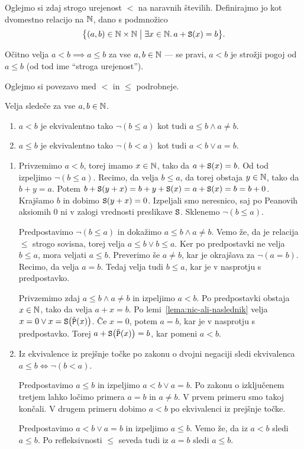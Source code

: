 Oglejmo si zdaj strogo urejenost $<$ na naravnih številih.  Definirajmo jo kot dvomestno relacijo na $\mathbb{N}$, dano s podmnožico
\[\set[1]{(a, b) \in \NN \times \NN}{\some{x \in \NN}{a + \suc(x) = b}}.\]

Očitno velja $a < b \implies a \leq b$ za vse $a, b \in \mathbb{N}$ --- se pravi, $a < b$ je strožji pogoj od $a \leq b$ (od tod ime ``stroga urejenost'').

Oglejmo si povezavo med $<$ in $\leq$ podrobneje.

\begin{trditev}
Velja sledeče za vse $a, b \in \mathbb{N}$.
\begin{enumerate}
\item
$a < b$ je ekvivalentno tako $\lnot(b \leq a)$ kot tudi $a \leq b \land a \neq b$.
\item
$a \leq b$ je ekvivalentno tako $\lnot(b < a)$ kot tudi $a < b \lor a = b$.
\end{enumerate}
\end{trditev}

\begin{dokaz}
\begin{enumerate}
\item
Privzemimo $a < b$, torej imamo $x \in \mathbb{N}$, tako da $a + \mathtt{S}(x) = b$. Od tod izpeljimo $\lnot(b \leq a)$. Recimo, da velja $b \leq a$, da torej obstaja $y \in \mathbb{N}$, tako da $b + y = a$. Potem $b + \mathtt{S}(y + x) = b + y + \mathtt{S}(x) = a + \mathtt{S}(x) = b = b + 0$. Krajšamo $b$ in dobimo $\mathtt{S}(y + x) = 0$. Izpeljali smo neresnico, saj po Peanovih aksiomih $0$ ni v zalogi vrednosti preslikave $\mathtt{S}$. Sklenemo $\lnot(b \leq a)$.

Predpostavimo $\lnot(b \leq a)$ in dokažimo $a \leq b \land a \neq b$. Vemo že, da je relacija $\leq$ strogo sovisna, torej velja $a \leq b \lor b \leq a$. Ker po predpostavki ne velja $b \leq a$, mora veljati $a \leq b$. Preverimo še $a \neq b$, kar je okrajšava za $\lnot(a = b)$. Recimo, da velja $a = b$. Tedaj velja tudi $b \leq a$, kar je v nasprotju s predpostavko.

Privzemimo zdaj $a \leq b \land a \neq b$ in izpeljimo $a < b$. Po predpostavki obstaja $x \in \mathbb{N}$, tako da velja $a + x = b$. Po lemi~\ref{lema:nic-ali-naslednik} velja $x = 0 \lor x = \mathtt{S}\big(\tilde{\mathtt{P}}(x)\big)$. Če $x = 0$, potem $a = b$, kar je v nasprotju s predpostavko. Torej $a + \mathtt{S}\big(\tilde{\mathtt{P}}(x)\big) = b$, kar pomeni $a < b$.
\item
Iz ekvivalence iz prejšnje točke po zakonu o dvojni negaciji sledi ekvivalenca $a \leq b \iff \lnot(b < a)$.

Predpostavimo $a \leq b$ in izpeljimo $a < b \lor a = b$. Po zakonu o izključenem tretjem lahko ločimo primera $a = b$ in $a \neq b$. V prvem primeru smo takoj končali. V drugem primeru dobimo $a < b$ po ekvivalenci iz prejšnje točke.

Predpostavimo $a < b \lor a = b$ in izpeljimo $a \leq b$. Vemo že, da iz $a < b$ sledi $a \leq b$. Po refleksivnosti $\leq$ seveda tudi iz $a = b$ sledi $a \leq b$.
\end{enumerate}
\end{dokaz}

